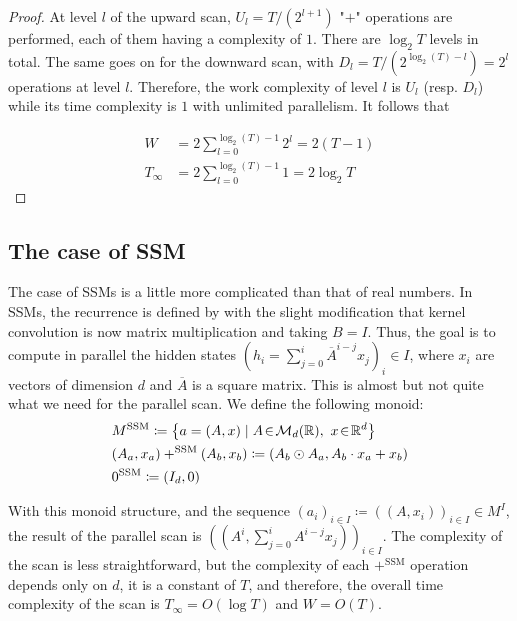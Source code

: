 \begin{proof}
At level $l$ of the upward scan, $U_l = T/(2^{l+1})$ "$+$" operations are performed, each of them having a complexity of $1$. There are $\log_2 T$ levels in total. The same goes on for the downward scan, with $D_l = T/(2^{\log_2(T) - l})=2^{l}$ operations at level $l$. Therefore, the work complexity of level $l$ is $U_l$ (resp. $D_l$) while its time complexity is $1$ with unlimited parallelism. It follows that

\begin{align}
\label{eq:W_integer}
W &= 2\sum_{l=0}^{\log_2(T)-1}2^l=2(T-1)\\
\label{eq:T_integer}
T_\infty&= 2\sum_{l=0}^{\log_2(T)-1}1=2\log_2T
\end{align}
\end{proof}

\subsection{The case of SSM}
\label{sec:scan_SSM}

The case of SSMs is a little more complicated than that of real numbers. In SSMs, the recurrence is defined by  with the slight modification that kernel convolution is now matrix multiplication and taking $B = I$. Thus, the goal is to compute in parallel the hidden states $(h_i = \sum_{j=0}^i\overline{A}^{i-j}x_j)_i\in I$, where $x_i$ are vectors of dimension $d$ and $\overline{A}$ is a square matrix. This is almost but not quite what we need for the parallel scan. We define the following monoid:
\begin{align}
\label{eq:M_SSM}
    &M^{\mathrm{SSM}}\coloneqq \left\{a = (A, x)\mid A\!\in\!\mathcal{M}_{d}(\mathbb{R}),~x\!\in\!\mathbb{R}^d\right\}\\
\label{eq:+_SSM}
    &(A_a, x_a) +^{\mathrm{SSM}} (A_b,x_b)\coloneqq (A_b \odot A_a, A_b \cdot x_a + x_b)\\
\label{eq:0_SSM}
    &0^{\mathrm{SSM}}\coloneqq(I_d, 0)
\end{align}

With this monoid structure, and the sequence $(a_i)_{i\in I} \coloneqq ((A, x_i))_{i\in I} \in M^I$, the result of the parallel scan is $((A^i, \sum_{j=0}^iA^{i-j}x_j))_{i\in I}$. The complexity of the scan is less straightforward, but the complexity of each $+^{\mathrm{SSM}}$ operation depends only on $d$, it is a constant of $T$, and therefore, the overall time complexity of the scan is $T_\infty= O(\log T)$ and $W=O(T)$.

